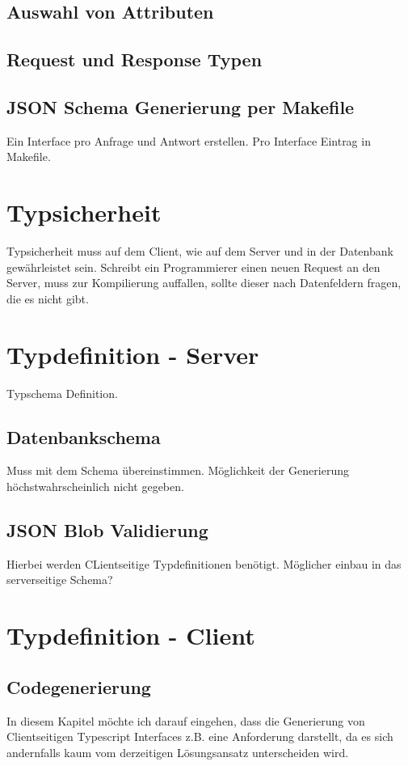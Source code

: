 \subsection{Auswahl von Attributen}
\subsection{Request und Response Typen}
\subsection{JSON Schema Generierung per Makefile}
Ein Interface pro Anfrage und Antwort erstellen. Pro Interface Eintrag in Makefile.

\section{Typsicherheit}
Typsicherheit muss auf dem Client, wie auf dem Server und in der Datenbank gewährleistet sein. Schreibt ein Programmierer einen neuen Request an den Server,
muss zur Kompilierung auffallen, sollte dieser nach Datenfeldern fragen, die es nicht gibt.

\section{Typdefinition - Server}
Typschema Definition.

\subsection{Datenbankschema}
Muss mit dem Schema übereinstimmen. Möglichkeit der Generierung höchstwahrscheinlich nicht gegeben.
\subsection{JSON Blob Validierung}
Hierbei werden CLientseitige Typdefinitionen benötigt. Möglicher einbau in das serverseitige Schema?

\section{Typdefinition - Client}
\subsection{Codegenerierung}
In diesem Kapitel möchte ich darauf eingehen, dass die Generierung von Clientseitigen Typescript Interfaces z.B. eine Anforderung darstellt, 
da es sich andernfalls kaum vom derzeitigen Lösungsansatz unterscheiden wird. 


